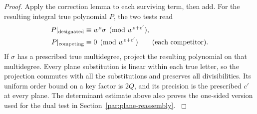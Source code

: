 \begin{proof}
Apply the correction lemma to each surviving term, then add.
For the resulting integral true polynomial \(P\), the two tests read
\[
 \begin{aligned}P|_{\rm designated}&\equiv w^o\sigma\pmod{w^{o+c'}},\\ P|_{\rm competing}&\equiv0\pmod{w^{o+c'}}\qquad(\text{each competitor}).\end{aligned}
\]
If \(\sigma\) has a prescribed true multidegree,
project the resulting polynomial on that multidegree.
Every plane substitution is linear within each true
letter, so the projection commutes with all the substitutions
and preserves all divisibilities.  Its uniform order
bound on a key factor is \(2Q\), and its precision is the
prescribed \(c'\) at every plane. The determinant estimate above
also proves the one-sided version used for the dual test in
Section~\ref{par:plane-reassembly}. \label{cor:plane-symbols-2}
\end{proof}
